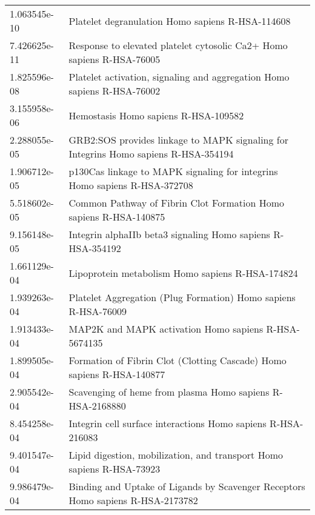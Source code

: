 \begin{longtable}{p{2.4cm}p{14.5cm}}
\bottomrule
\endlastfoot
             1.063545e-10 &                                              Platelet degranulation Homo sapiens R-HSA-114608 \\
             7.426625e-11 &                         Response to elevated platelet cytosolic Ca2+ Homo sapiens R-HSA-76005 \\
             1.825596e-08 &                       Platelet activation, signaling and aggregation Homo sapiens R-HSA-76002 \\
             3.155958e-06 &                                                          Hemostasis Homo sapiens R-HSA-109582 \\
             2.288055e-05 &           GRB2:SOS provides linkage to MAPK signaling for Integrins Homo sapiens R-HSA-354194 \\
             1.906712e-05 &                     p130Cas linkage to MAPK signaling for integrins Homo sapiens R-HSA-372708 \\
             5.518602e-05 &                             Common Pathway of Fibrin Clot Formation Homo sapiens R-HSA-140875 \\
             9.156148e-05 &                                   Integrin alphaIIb beta3 signaling Homo sapiens R-HSA-354192 \\
             1.661129e-04 &                                              Lipoprotein metabolism Homo sapiens R-HSA-174824 \\
             1.939263e-04 &                                Platelet Aggregation (Plug Formation) Homo sapiens R-HSA-76009 \\
             1.913433e-04 &                                          MAP2K and MAPK activation Homo sapiens R-HSA-5674135 \\
             1.899505e-04 &                         Formation of Fibrin Clot (Clotting Cascade) Homo sapiens R-HSA-140877 \\
             2.905542e-04 &                                     Scavenging of heme from plasma Homo sapiens R-HSA-2168880 \\
             8.454258e-04 &                                  Integrin cell surface interactions Homo sapiens R-HSA-216083 \\
             9.401547e-04 &                         Lipid digestion, mobilization, and transport Homo sapiens R-HSA-73923 \\
             9.986479e-04 &               Binding and Uptake of Ligands by Scavenger Receptors Homo sapiens R-HSA-2173782 \\

\end{longtable}
